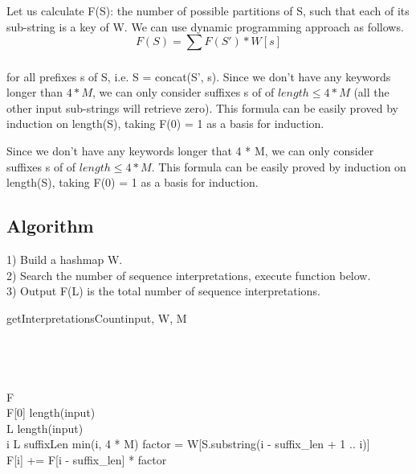 \documentclass[a4paper]{article}
\begin{document}
Let us calculate F(S): the number of possible partitions of S, such that each of its sub-string is a key of W. We can use dynamic programming approach as follows.\\

\begin{equation}
\label{alg_pol_formula2}
F(S) = \sum_{}{}{ F(S') * W[s]}
\end{equation}

for all prefixes s of S, i.e. S = concat(S', s). Since we don't have any keywords longer than $4 * M$, we can only consider suffixes s of of $length \leq 4 * M$ (all the other input sub-strings will retrieve zero). This formula can be easily proved by induction on length(S), taking F(0) = 1 as a basis for induction.


Since we don't have any keywords longer that 4 * M, we can only consider suffixes s of of $length \leq 4 * M$. This formula can be easily proved by induction on length(S), taking F(0) = 1 as a basis for induction.



\subsection{Algorithm}
1) Build a hashmap W.\\
2) Search the number of sequence interpretations, execute  function below.\\
3) Output F(L) is the total number of sequence interpretations.\\
\begin{pseudocode}[ruled]{getInterpretationsCount}{input, W, M}\\
\\
\\
\\
\\
F \GETS []\\
F[0] \GETS length(input)\\
L \GETS length(input)\\
\FOR i  \TO L \DO
\BEGIN
\FOR suffixLen  \TO min(i, 4 * M)  \DO
	\BEGIN
	factor = W[S.substring(i - suffix_len + 1 .. i)]\\
    F[i] += F[i - suffix_len] * factor
    \END \\
    \END \\
\end{pseudocode}
\end{document}
